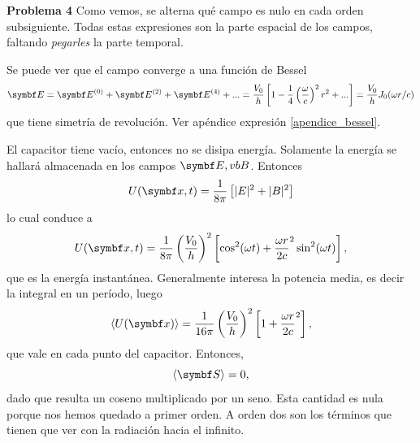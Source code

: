\documentclass[10pt,oneside]{CBFT_book}
\begin{document}
\begin{ejemplo}{\bf Problema 4}
Como vemos, se alterna qué campo es nulo en cada orden subsiguiente. Todas estas expresiones son
la parte espacial de los campos, faltando {\it pegarles} la parte temporal.

Se puede ver que el campo converge a una función de Bessel
\[
	\vb{E} = \vb{E}^{(0)} + \vb{E}^{(2)} + \vb{E}^{(4)} + ... =
	\frac{V_0}{h} \left[ 1 - \frac{1}{4} \Frac{\omega}{c}^2 r^2 + ...\right] =
	\frac{V_0}{h} J_0( \omega r / c )
\]
que tiene simetría de revolución. Ver apéndice expresión \ref{apendice_bessel}.

El capacitor tiene vacío, entonces no se disipa energía. Solamente la energía se hallará almacenada
en los campos $\vb{E}, vb{B}$.
Entonces
\[
	U(\vbx,t) = \frac{1}{8\pi} \left[ |E|^2 + |B|^2 \right]
\]
lo cual conduce a
\[
	U(\vbx,t) = \frac{1}{8\pi} \Frac{V_0}{h}^2 
	\left[ \cos^2(\omega t) + \frac{\omega r}{2c}^2 \sin^2(\omega t) \right],
\]
que es la energía instantánea. Generalmente interesa la potencia media, es decir la integral en un
período, luego
\[
	\langle U(\vbx) \rangle = \frac{1}{16\pi} \Frac{V_0}{h}^2 
	\left[ 1 + \frac{\omega r}{2c}^2 \right],
\]
que vale en cada punto del capacitor. Entonces,
\[
	\langle \vb{S} \rangle = 0,
\]
dado que resulta un coseno multiplicado por un seno. Esta cantidad es nula porque nos hemos quedado
a primer orden. A orden dos son los términos que tienen que ver con la radiación hacia el infinito.
 
\end{ejemplo}
\end{document}
